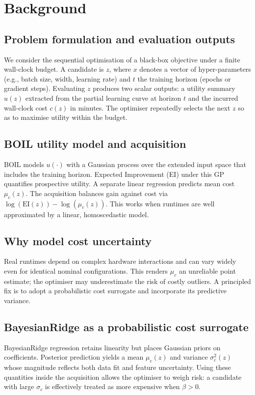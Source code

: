 \documentclass{article} %
\begin{document}
\section{Background}
\label{sec:background}
\subsection{Problem formulation and evaluation outputs}
We consider the sequential optimisation of a black-box objective under a finite wall-clock budget. A candidate is $z$, where $x$ denotes a vector of hyper-parameters (e.g., batch size, width, learning rate) and $t$ the training horizon (epochs or gradient steps). Evaluating $z$ produces two scalar outputs: a utility summary $u(z)$ extracted from the partial learning curve at horizon $t$ and the incurred wall-clock cost $c(z)$ in minutes. The optimiser repeatedly selects the next $z$ so as to maximise utility within the budget.

\subsection{BOIL utility model and acquisition}
BOIL models $u(\cdot)$ with a Gaussian process over the extended input space that includes the training horizon. Expected Improvement (EI) under this GP quantifies prospective utility. A separate linear regression predicts mean cost $\mu_c(z)$. The acquisition balances gain against cost via $\log(\mathrm{EI}(z)) - \log(\mu_c(z))$. This works when runtimes are well approximated by a linear, homoscedastic model.

\subsection{Why model cost uncertainty}
Real runtimes depend on complex hardware interactions and can vary widely even for identical nominal configurations. This renders $\mu_c$ an unreliable point estimate; the optimiser may underestimate the risk of costly outliers. A principled fix is to adopt a probabilistic cost surrogate and incorporate its predictive variance.

\subsection{BayesianRidge as a probabilistic cost surrogate}
BayesianRidge regression retains linearity but places Gaussian priors on coefficients. Posterior prediction yields a mean $\mu_c(z)$ and variance $\sigma_c^2(z)$ whose magnitude reflects both data fit and feature uncertainty. Using these quantities inside the acquisition allows the optimiser to weigh risk: a candidate with large $\sigma_c$ is effectively treated as more expensive when $\beta>0$.
\end{document}
